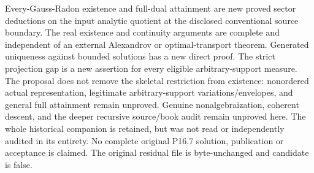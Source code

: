 Every-Gauss-Radon existence and full-dual attainment are new proved
sector deductions on the input analytic quotient at the disclosed
conventional source boundary. The real existence and continuity
arguments are complete and independent of an external Alexandrov or
optimal-transport theorem. Generated uniqueness against bounded
solutions has a new direct proof. The strict projection gap is a
new assertion for every eligible arbitrary-support measure.
The proposal does not remove the skeletal restriction from existence:
nonordered actual representation, legitimate arbitrary-support
variations/envelopes, and general full attainment remain unproved.
Genuine nonalgebraization, coherent descent, and the deeper recursive
source/book audit remain unproved here. The whole historical companion
is retained, but was not read or independently audited in its entirety.
No complete original P16.7 solution, publication or acceptance is
claimed. The original residual file is byte-unchanged and candidate
is false.
